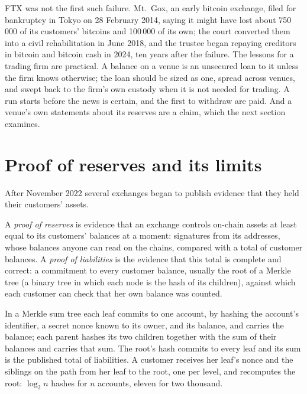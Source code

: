 FTX was not the first such failure. Mt.~Gox, an early bitcoin exchange, filed for bankruptcy in Tokyo
on 28 February 2014, saying it might have lost about 750\,000 of its customers' bitcoins and 100\,000 of
its own; the court converted them into a civil rehabilitation in June 2018, and the
trustee began repaying creditors in bitcoin and bitcoin cash in 2024, ten years after the failure. The
lessons for a trading firm are practical. A balance on a venue is an unsecured loan to it unless the firm
knows otherwise; the loan should be sized as one, spread across venues, and swept back to the firm's own
custody when it is not needed for trading. A run starts before the news is certain, and the first to
withdraw are paid. And a venue's own statements about its reserves are a claim, which the next section
examines.

\section{Proof of reserves and its limits}

After November 2022 several exchanges began to publish evidence that they held their customers' assets.

\begin{definition}\label{def:m3:centralised-exchanges:por}
A \emph{proof of reserves} is evidence that an exchange controls on-chain assets
at least equal to its customers' balances at a moment: signatures from its addresses, whose balances
anyone can read on the chains, compared with a total of customer balances. A \emph{proof of
liabilities} is the evidence that this total is complete and correct: a
commitment to every customer balance, usually the root of a Merkle tree (a binary tree in which each node
is the hash of its children), against which each customer can check that her own balance was counted.
\end{definition}

In a Merkle sum tree each leaf commits to one account, by hashing the account's identifier, a secret nonce
known to its owner, and its balance, and carries the balance; each parent hashes its two children together
with the sum of their balances and carries that sum. The root's hash commits to every leaf and its sum is
the published total of liabilities. A customer receives her leaf's nonce and the siblings on the path from
her leaf to the root, one per level, and recomputes the root: $\log_2 n$ hashes for $n$ accounts, eleven
for two thousand.

